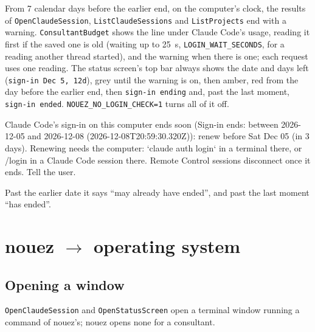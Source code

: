 \documentclass[10pt,a4paper]{article}
\newcommand{\code}[1]{\texttt{#1}}
\begin{document}
From 7 calendar days before the earlier end, on the computer's clock, the results of \code{OpenClaudeSession},
\code{ListClaudeSessions} and \code{ListProjects} end with a warning. \code{ConsultantBudget}
shows the line under Claude Code's usage, reading it first if the saved one is old (waiting up to
25~s, \code{LOGIN\_WAIT\_SECONDS}, for a reading another thread started), and the warning when
there is one; each request uses one reading. The status screen's top bar always shows the date and
days left (\code{sign-in Dec 5, 12d}), grey until the warning is on, then amber, red from the day before the earlier end, then
\code{sign-in ending} and, past the last moment, \code{sign-in ended}. \code{NOUEZ\_NO\_LOGIN\_CHECK=1} turns all of it off.
\begin{plain}
Claude Code's sign-in on this computer ends soon (Sign-in ends: between 2026-12-05 and 2026-12-08 (2026-12-08T20:59:30.320Z)): renew before Sat Dec 05 (in 3 days). Renewing needs the computer: `claude auth login` in a terminal there, or /login in a Claude Code session there. Remote Control sessions disconnect once it ends. Tell the user.
\end{plain}
Past the earlier date it says ``may already have ended'', and past the last moment ``has ended''.

\section{nouez \texorpdfstring{$\rightarrow$}{->} operating system}
\label{sec:os}

\subsection{Opening a window}

\code{OpenClaudeSession} and \code{OpenStatusScreen} open a terminal window running a command of
nouez's; nouez opens none for a consultant.
\end{document}
